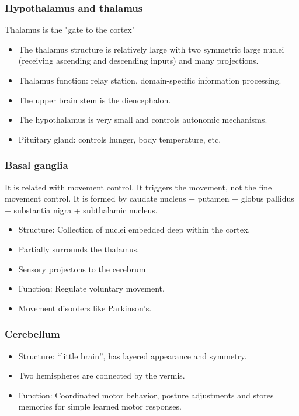\documentclass[main]{subfiles}
\begin{document}
\subsubsection{Hypothalamus and thalamus}
Thalamus is the "gate to the cortex"

\begin{itemize}[noitemsep,nolistsep]
	\item The thalamus structure is relatively large with two symmetric large nuclei (receiving ascending and descending inputs) and many projections.
	\item Thalamus function: relay station, domain-specific information processing.
	\item The upper brain stem is the diencephalon.
	\item The hypothalamus is very small and controls autonomic mechanisms.
	\item Pituitary gland: controls hunger, body temperature, etc.
\end{itemize}

\subsubsection{Basal ganglia}
It is related with movement control. It triggers the movement, not the fine movement control. It is formed by caudate nucleus + putamen + globus pallidus +
substantia nigra + subthalamic nucleus.

\begin{itemize}[noitemsep,nolistsep]
	\item Structure: Collection of nuclei embedded deep within the cortex.
	\item Partially surrounds the thalamus.
	\item Sensory projectons to the cerebrum
	\item Function: Regulate voluntary movement.
	\item Movement disorders like Parkinson's.
\end{itemize}

\subsubsection{Cerebellum}
\begin{itemize}[noitemsep,nolistsep]
	\item Structure: ``little brain'', has layered appearance and symmetry.
	\item Two hemispheres are connected by the vermis.
	\item Function: Coordinated motor behavior, posture adjustments and stores memories for simple learned motor responses.
\end{itemize}
\end{document}
